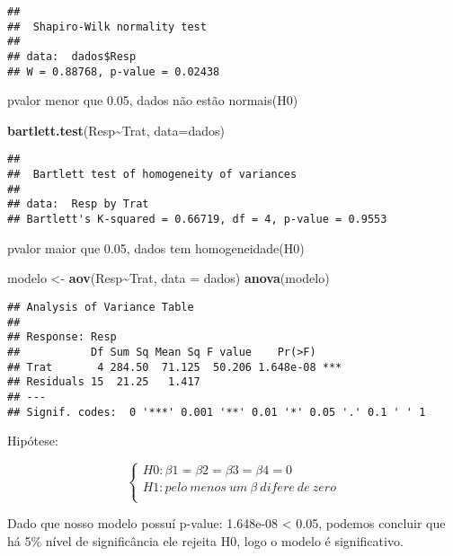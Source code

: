 \documentclass[
]{article}
\newenvironment{Shaded}{\begin{snugshade}}{\end{snugshade}}
\newcommand{\AttributeTok}[1]{\textcolor[rgb]{0.13,0.29,0.53}{#1}}
\newcommand{\FunctionTok}[1]{\textcolor[rgb]{0.13,0.29,0.53}{\textbf{#1}}}
\newcommand{\NormalTok}[1]{#1}
\newcommand{\OtherTok}[1]{\textcolor[rgb]{0.56,0.35,0.01}{#1}}
\newcommand{\SpecialCharTok}[1]{\textcolor[rgb]{0.81,0.36,0.00}{\textbf{#1}}}
\begin{document}
\begin{verbatim}
## 
##  Shapiro-Wilk normality test
## 
## data:  dados$Resp
## W = 0.88768, p-value = 0.02438
\end{verbatim}

pvalor menor que 0.05, dados não estão normais(H0)

\begin{Shaded}
\begin{Highlighting}[]
\FunctionTok{bartlett.test}\NormalTok{(Resp}\SpecialCharTok{\textasciitilde{}}\NormalTok{Trat, }\AttributeTok{data=}\NormalTok{dados)}
\end{Highlighting}
\end{Shaded}

\begin{verbatim}
## 
##  Bartlett test of homogeneity of variances
## 
## data:  Resp by Trat
## Bartlett's K-squared = 0.66719, df = 4, p-value = 0.9553
\end{verbatim}

pvalor maior que 0.05, dados tem homogeneidade(H0)

\begin{Shaded}
\begin{Highlighting}[]
\NormalTok{modelo }\OtherTok{\textless{}{-}} \FunctionTok{aov}\NormalTok{(Resp}\SpecialCharTok{\textasciitilde{}}\NormalTok{Trat, }\AttributeTok{data =}\NormalTok{ dados)}
\FunctionTok{anova}\NormalTok{(modelo) }
\end{Highlighting}
\end{Shaded}

\begin{verbatim}
## Analysis of Variance Table
## 
## Response: Resp
##           Df Sum Sq Mean Sq F value    Pr(>F)    
## Trat       4 284.50  71.125  50.206 1.648e-08 ***
## Residuals 15  21.25   1.417                      
## ---
## Signif. codes:  0 '***' 0.001 '**' 0.01 '*' 0.05 '.' 0.1 ' ' 1
\end{verbatim}

Hipótese:

\[
\left\{ \begin{array}{rc} 
H0: \beta1 = \beta2 = \beta3 = \beta4 = 0 \\ 
H1: pelo \ menos \ um \ \beta \ difere \ de \ zero \\ 
\end{array}\right.
\]

Dado que nosso modelo possuí p-value: 1.648e-08 \textless{} 0.05,
podemos concluir que há 5\% nível de significância ele rejeita H0, logo
o modelo é significativo.
\end{document}
